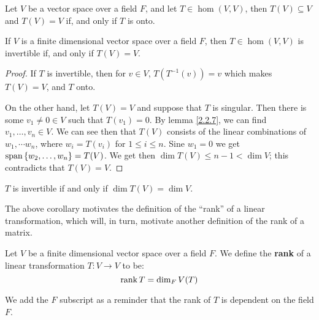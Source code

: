 \begin{lemma}\label{3.2.7}
    Let $V$ be a vector space over a field  $F$, and let  $T \in \hom{(V,V)}$,
    then $T(V) \subseteq V$ and $T(V)=V$ if, and only if $T$ is onto.
\end{lemma}

\begin{theorem}\label{3.1.8}
    If $V$ is a finite dimensional vector space over a field  $F$, then  $T \in
    \hom{(V,V)}$ is invertible if, and only if $T(V)=V$.
\end{theorem}
\begin{proof}
    If $T$ is invertible, then for  $v \in V$,  $T(T^{-1}(v))=v$ which makes
    $T(V)=V$, and $T$ onto.

    On the other hand, let $T(V)=V$ and suppose that $T$ is singular. Then there
    is some  $v_1 \neq 0 \in V$ such that $T(v_1)=0$. By lemma \ref{2.2.7}, we
    can find $v_1 ,\dots, v_n \in V$. We can see then that $T(V)$ consists of
    the linear combinations of $w_1, \dotsm w_n$, where $w_i=T(v_i)$ for $1 \leq
    i \leq n$. Sine  $w_1=0$ we get $\operatorname{span}{\{w_2, \dots, w_n\}}=T(V)$. We get
    then $\dim{T(V)} \leq n-1<\dim{V}$; this contradicts that $T(V)=V$.
\end{proof}
\begin{corollary}
    $T$ is invertible if and only if  $\dim{T(V)}=\dim{V}$.
\end{corollary}

The above corollary motivates the definition of the ``rank'' of a linear
transformation, which will, in turn, motivate another definition of the rank of a
matrix.

\begin{definition}
    Let $V$ be a finite dimensional vector space over a field  $F$. We define
    the \textbf{rank} of a linear transformation $T:V \rightarrow V$ to be:
        \begin{equation}
            \operatorname{rank}{T}=\dim_F{V(T)}
        \end{equation} 
\end{definition}

We add the $F$ subscript as a reminder that the rank of  $T$ is dependent on the
field  $F$. 

